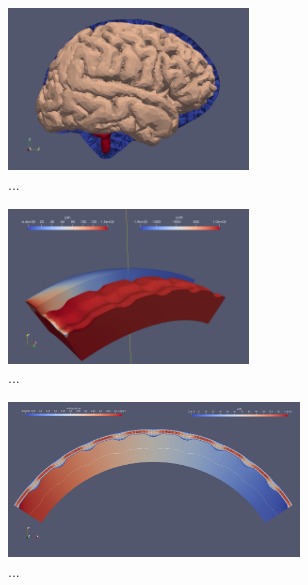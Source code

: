 \documentclass[
	10pt, %
]{beamer}
\begin{document}
\begin{frame}
	\begin{figure}
		\centering
		\begin{subfigure}[b]{0.32\textwidth}
			\centering
			\includegraphics[width=0.70\textwidth]{new_figures/real_brain_full.png}
			\caption{...}
		\end{subfigure}
		\hfill
		\begin{subfigure}[b]{0.32\textwidth}
			\centering
			\includegraphics[width=0.70\textwidth]{new_figures/3D_profile.png}
			\caption{...}
		\end{subfigure}
		\hfill
		\begin{subfigure}[b]{0.32\textwidth}
			\centering
			\includegraphics[width=0.85\textwidth]{new_figures/2D_view.png}
			\caption{...}
		\end{subfigure}
		\hfill
		   \caption{}
	  \end{figure}

\end{frame}
\end{document}
